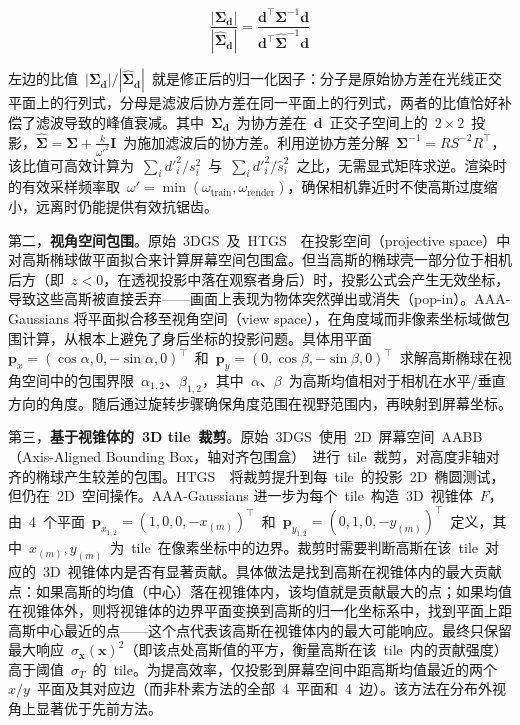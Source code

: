 \begin{equation}
\frac{|\boldsymbol{\Sigma}_{\mathbf{d}}|}{|\hat{\boldsymbol{\Sigma}}_{\mathbf{d}}|} = \frac{\mathbf{d}^\top \boldsymbol{\Sigma}^{-1} \mathbf{d}}{\mathbf{d}^\top \hat{\boldsymbol{\Sigma}}^{-1} \mathbf{d}}
\end{equation}

左边的比值~$|\boldsymbol{\Sigma}_{\mathbf{d}}|/|\hat{\boldsymbol{\Sigma}}_{\mathbf{d}}|$~就是修正后的归一化因子：分子是原始协方差在光线正交平面上的行列式，分母是滤波后协方差在同一平面上的行列式，两者的比值恰好补偿了滤波导致的峰值衰减。其中~$\boldsymbol{\Sigma}_{\mathbf{d}}$~为协方差在~$\mathbf{d}$~正交子空间上的~$2\times 2$~投影，$\hat{\boldsymbol{\Sigma}} = \boldsymbol{\Sigma} + \frac{k}{\omega'^2}\mathbf{I}$~为施加滤波后的协方差。利用逆协方差分解~$\boldsymbol{\Sigma}^{-1} = R S^{-2} R^\top$，该比值可高效计算为~$\sum_i d'^2_i / s^2_i$~与~$\sum_i d'^2_i / \hat{s}^2_i$~之比，无需显式矩阵求逆。渲染时的有效采样频率取~$\omega' = \min(\omega_{\text{train}}, \omega_{\text{render}})$，确保相机靠近时不使高斯过度缩小，远离时仍能提供有效抗锯齿。

第二，\textbf{视角空间包围}。原始~3DGS~及~HTGS~\cite{2410_08129}~在投影空间（projective space）中对高斯椭球做平面拟合来计算屏幕空间包围盒。但当高斯的椭球壳一部分位于相机后方（即~$z < 0$，在透视投影中落在观察者身后）时，投影公式会产生无效坐标，导致这些高斯被直接丢弃——画面上表现为物体突然弹出或消失（pop-in）。AAA-Gaussians 将平面拟合移至视角空间（view space），在角度域而非像素坐标域做包围计算，从根本上避免了身后坐标的投影问题。具体用平面~$\mathbf{p}_x = (\cos\alpha, 0, -\sin\alpha, 0)^\top$~和~$\mathbf{p}_y = (0, \cos\beta, -\sin\beta, 0)^\top$~求解高斯椭球在视角空间中的包围界限~$\alpha_{1,2}$、$\beta_{1,2}$，其中~$\alpha$、$\beta$~为高斯均值相对于相机在水平/垂直方向的角度。随后通过旋转步骤确保角度范围在视野范围内，再映射到屏幕坐标。

第三，\textbf{基于视锥体的~3D tile~裁剪}。原始~3DGS~使用~2D~屏幕空间~AABB（Axis-Aligned Bounding Box，轴对齐包围盒）~进行~tile~裁剪，对高度非轴对齐的椭球产生较差的包围。HTGS~\cite{2410_08129}~将裁剪提升到每~tile~的投影~2D~椭圆测试，但仍在~2D~空间操作。AAA-Gaussians 进一步为每个~tile~构造~3D~视锥体~$F$，由~4~个平面~$\mathbf{p}_{x_{1,2}} = (1, 0, 0, -x_{(m)})^\top$~和~$\mathbf{p}_{y_{1,2}} = (0, 1, 0, -y_{(m)})^\top$~定义，其中~$x_{(m)}, y_{(m)}$~为~tile~在像素坐标中的边界。裁剪时需要判断高斯在该~tile~对应的~3D~视锥体内是否有显著贡献。具体做法是找到高斯在视锥体内的最大贡献点：如果高斯的均值（中心）落在视锥体内，该均值就是贡献最大的点；如果均值在视锥体外，则将视锥体的边界平面变换到高斯的归一化坐标系中，找到平面上距高斯中心最近的点——这个点代表该高斯在视锥体内的最大可能响应。最终只保留最大响应~$\sigma_{\mathbf{x}}(\mathbf{x})^2$（即该点处高斯值的平方，衡量高斯在该~tile~内的贡献强度）高于阈值~$\sigma_T$~的~tile。为提高效率，仅投影到屏幕空间中距高斯均值最近的两个~$x/y$~平面及其对应边（而非朴素方法的全部~4~平面和~4~边）。该方法在分布外视角上显著优于先前方法。

